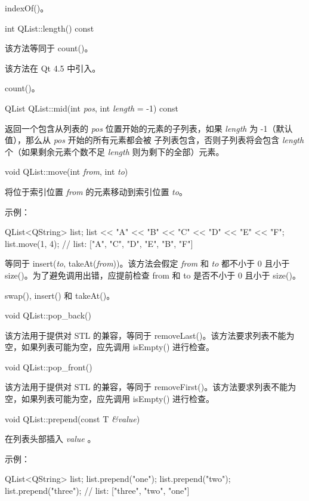 \begin{seeAlso}
indexOf()。
\end{seeAlso}


int QList::length() const

该方法等同于 count()。

该方法在 Qt 4.5 中引入。


\begin{seeAlso}
count()。
\end{seeAlso}


QList QList::mid(int \emph{pos}, int \emph{length} = -1) const

返回一个包含从列表的 \emph{pos} 位置开始的元素的子列表，如果
\emph{length} 为 -1（默认值），那么从 \emph{pos} 开始的所有元素都会被
子列表包含，否则子列表将会包含 \emph{length} 个（如果剩余元素个数不足 \emph{length} 则为剩下的全部）元素。

void QList::move(int \emph{from}, int \emph{to})

将位于索引位置 \emph{from} 的元素移动到索引位置 \emph{to}。

示例：


\begin{cppcode}
QList<QString> list;
list << "A" << "B" << "C" << "D" << "E" << "F";
list.move(1, 4);
// list: ["A", "C", "D", "E", "B", "F"]
\end{cppcode}

等同于 insert(\emph{to}, takeAt(\emph{from}))。该方法会假定 \emph{from} 和 \emph{to} 都不小于 0 且小于 size()。为了避免调用出错，应提前检查 from 和 to 是否不小于 0 且小于 size()。

\begin{seeAlso}
swap(), insert() 和 takeAt()。
\end{seeAlso}

void QList::pop\_back()

该方法用于提供对 STL 的兼容，等同于 removeLast()。该方法要求列表不能为空，如果列表可能为空，应先调用 isEmpty() 进行检查。

void QList::pop\_front()

该方法用于提供对 STL 的兼容，等同于 removeFirst()。该方法要求列表不能为空，如果列表可能为空，应先调用 isEmpty() 进行检查。

void QList::prepend(const T \emph{\&value})

在列表头部插入 \emph{value} 。

示例：


\begin{cppcode}
QList<QString> list;
list.prepend("one");
list.prepend("two");
list.prepend("three");
// list: ["three", "two", "one"]
\end{cppcode}


